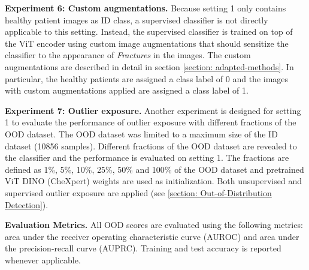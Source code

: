 \par
\textbf{Experiment 6: Custom augmentations.}
Because setting 1 only contains healthy patient images as ID class, a supervised classifier is not directly applicable to this setting.
Instead, the supervised classifier is trained on top of the ViT encoder using custom image augmentations that should sensitize the classifier to the appearance of \textit{Fractures} in the images.
The custom augmentations are described in detail in section \ref{section: adapted-methods}.
In particular, the healthy patients are assigned a class label of 0 and the images with custom augmentations applied are assigned a class label of 1.
\par
\textbf{Experiment 7: Outlier exposure.}
Another experiment is designed for setting 1 to evaluate the performance of outlier exposure with different fractions of the OOD dataset.
The OOD dataset was limited to a maximum size of the ID dataset (10856 samples).
Different fractions of the OOD dataset are revealed to the classifier and the performance is evaluated on setting 1.
The fractions are defined as 1\%, 5\%, 10\%, 25\%, 50\% and 100\% of the OOD dataset and pretrained ViT DINO (CheXpert) weights are used as initialization.
Both unsupervised and supervised outlier exposure are applied (see \ref{section: Out-of-Distribution Detection}).
\par
\textbf{Evaluation Metrics.}
All OOD scores are evaluated using the following metrics: area under the receiver operating characteristic curve (AUROC) and area under the precision-recall curve (AUPRC).
Training and test accuracy is reported whenever applicable.